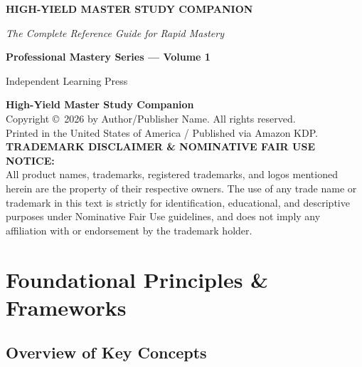 \documentclass[10pt,twoside,openright]{book}
\begin{document}
\frontmatter
\begin{titlepage}
    \centering
    \vspace*{1.5in}
    {\Huge\bfseries HIGH-YIELD MASTER STUDY COMPANION\par}
    \vspace{0.3in}
    {\Large\itshape The Complete Reference Guide for Rapid Mastery\par}
    \vspace{0.8in}
    {\Large\bfseries Professional Mastery Series --- Volume 1\par}
    \vfill
    {\large Independent Learning Press\par}
\end{titlepage}

\newpage
\thispagestyle{empty}
\vspace*{3.5in}

\noindent \textbf{High-Yield Master Study Companion}\\
Copyright \copyright\ 2026 by Author/Publisher Name. All rights reserved.\\

\noindent Printed in the United States of America / Published via Amazon KDP.\\

\vspace{0.2in}
\noindent \small{\textbf{TRADEMARK DISCLAIMER \& NOMINATIVE FAIR USE NOTICE:}\\
All product names, trademarks, registered trademarks, and logos mentioned herein are the property of their respective owners. The use of any trade name or trademark in this text is strictly for identification, educational, and descriptive purposes under Nominative Fair Use guidelines, and does not imply any affiliation with or endorsement by the trademark holder.}

\mainmatter

\chapter{Foundational Principles \& Frameworks}

\section{Overview of Key Concepts}
\end{document}
